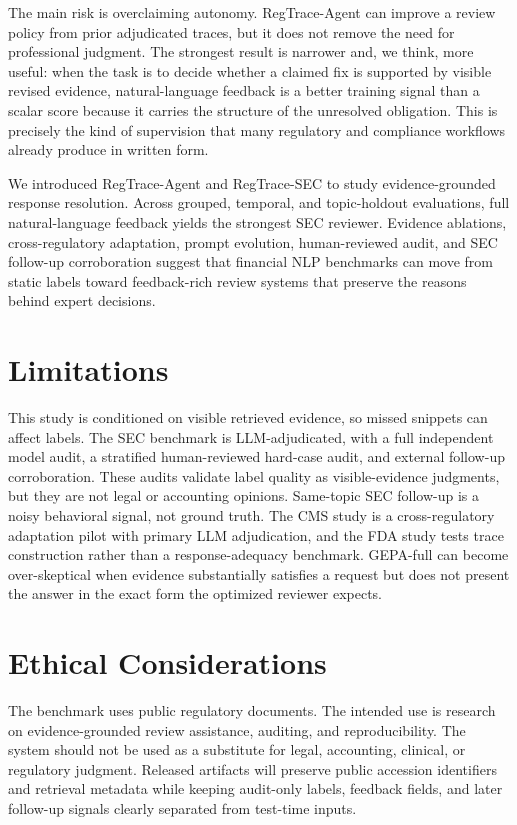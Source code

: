 \documentclass[11pt]{article}
\newcommand{\task}{evidence-grounded response resolution}
\newcommand{\dataset}{RegTrace-SEC}
\newcommand{\framework}{RegTrace-Agent}
\begin{document}
The main risk is overclaiming autonomy. \framework{} can improve a review policy from prior adjudicated traces, but it does not remove the need for professional judgment. The strongest result is narrower and, we think, more useful: when the task is to decide whether a claimed fix is supported by visible revised evidence, natural-language feedback is a better training signal than a scalar score because it carries the structure of the unresolved obligation. This is precisely the kind of supervision that many regulatory and compliance workflows already produce in written form.

We introduced \framework{} and \dataset{} to study \task{}. Across grouped, temporal, and topic-holdout evaluations, full natural-language feedback yields the strongest SEC reviewer. Evidence ablations, cross-regulatory adaptation, prompt evolution, human-reviewed audit, and SEC follow-up corroboration suggest that financial NLP benchmarks can move from static labels toward feedback-rich review systems that preserve the reasons behind expert decisions.

\section*{Limitations}

This study is conditioned on visible retrieved evidence, so missed snippets can affect labels. The SEC benchmark is LLM-adjudicated, with a full independent model audit, a stratified human-reviewed hard-case audit, and external follow-up corroboration. These audits validate label quality as visible-evidence judgments, but they are not legal or accounting opinions. Same-topic SEC follow-up is a noisy behavioral signal, not ground truth. The CMS study is a cross-regulatory adaptation pilot with primary LLM adjudication, and the FDA study tests trace construction rather than a response-adequacy benchmark. GEPA-full can become over-skeptical when evidence substantially satisfies a request but does not present the answer in the exact form the optimized reviewer expects.

\section*{Ethical Considerations}

The benchmark uses public regulatory documents. The intended use is research on evidence-grounded review assistance, auditing, and reproducibility. The system should not be used as a substitute for legal, accounting, clinical, or regulatory judgment. Released artifacts will preserve public accession identifiers and retrieval metadata while keeping audit-only labels, feedback fields, and later follow-up signals clearly separated from test-time inputs.
\end{document}
